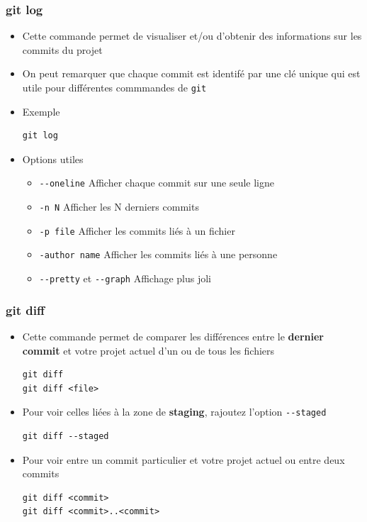 \documentclass{beamer}
\begin{document}
\begin{frame}[fragile]
\frametitle{git log}

\begin{itemize}
\item Cette commande permet de visualiser et/ou d'obtenir des informations sur les commits du projet
\item On peut remarquer que chaque commit est identifé par une clé unique qui est utile pour différentes commmandes de \texttt{git}
\item Exemple
\begin{lstlisting}
git log
\end{lstlisting}
\item Options utiles
	\begin{itemize}
		\item \lstinline{--oneline} Afficher chaque commit sur une seule ligne
		\item \lstinline{-n N} Afficher les N derniers commits 
		\item \lstinline{-p file} Afficher les commits liés à un fichier 
		\item \lstinline{-author name} Afficher les commits liés à une personne
		\item \lstinline{--pretty} et \lstinline{--graph} Affichage plus joli
	\end{itemize}
\end{itemize}
\end{frame}

\begin{frame}[fragile]
\frametitle{git diff}

\begin{itemize}
\item Cette commande permet de comparer les différences entre le \textbf{dernier commit} et votre projet actuel d'un ou de tous les fichiers
\begin{lstlisting}
git diff
git diff <file>
\end{lstlisting}

\item Pour voir celles liées à la zone de \textbf{staging}, rajoutez l'option \lstinline{--staged}
\begin{lstlisting}
git diff --staged
\end{lstlisting}

\item Pour voir entre un commit particulier et votre projet actuel ou entre deux commits
\begin{lstlisting}
git diff <commit>
git diff <commit>..<commit>
\end{lstlisting}
\end{itemize}
\end{frame}
\end{document}
